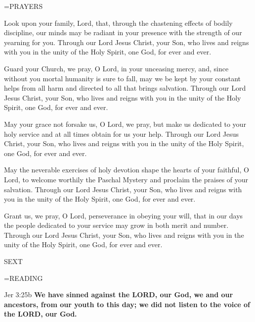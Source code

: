 \hangindent=\parindent \small PRAYERS
\begin{description}[labelindent=\parindent, noitemsep, leftmargin=*]
\item [Week 1:] 	Look upon your family, Lord, that, through the chastening effects of bodily discipline, our minds may be radiant in your presence with the strength of our yearning for you. Through our Lord Jesus Christ, your Son, who lives and reigns with you in the unity of the Holy Spirit, one God, for ever and ever.
\item [Week 2:] 	Guard your Church, we pray, O Lord, in your unceasing mercy, and, since without you mortal humanity is sure to fall, may we be kept by your constant helps from all harm and directed to all that brings salvation. Through our Lord Jesus Christ, your Son, who lives and reigns with you in the unity of the Holy Spirit, one God, for ever and ever.
\item [Week 3:] 	May your grace not forsake us, O Lord, we pray, but make us dedicated to your holy service and at all times obtain for us your help. Through our Lord Jesus Christ, your Son, who lives and reigns with you in the unity of the Holy Spirit, one God, for ever and ever.
\item [Week 4:] 	May the neverable exercises of holy devotion shape the hearts of your faithful, O Lord, to welcome worthily the Paschal Mystery and proclaim the praises of your salvation. Through our Lord Jesus Christ, your Son, who lives and reigns with you in the unity of the Holy Spirit, one God, for ever and ever.
\item [Week 5:] 	Grant us, we pray, O Lord, perseverance in obeying your will, that in our days the people dedicated to your service may grow in both merit and number. Through our Lord Jesus Christ, your Son, who lives and reigns with you in the unity of the Holy Spirit, one God, for ever and ever.
\end{description}

\begin{flushleft}\normalsize SEXT\\\end{flushleft}
\hangindent=\parindent \small READING
\begin{description}[labelindent=\parindent, leftmargin=*]
\item [Weeks 1-4:]     Jer 3:25b \textbf{    We have sinned against the LORD, our God, we and our ancestors, from our youth to this day; we did not listen to the voice of the LORD, our God.}
\end{description}


